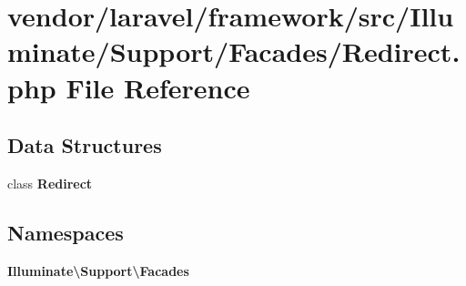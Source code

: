 \section{vendor/laravel/framework/src/\+Illuminate/\+Support/\+Facades/\+Redirect.php File Reference}
\label{_redirect_8php}
\subsection*{Data Structures}
\begin{DoxyCompactItemize}
\item 
class {\bf Redirect}
\end{DoxyCompactItemize}
\subsection*{Namespaces}
\begin{DoxyCompactItemize}
\item 
 {\bf Illuminate\textbackslash{}\+Support\textbackslash{}\+Facades}
\end{DoxyCompactItemize}
